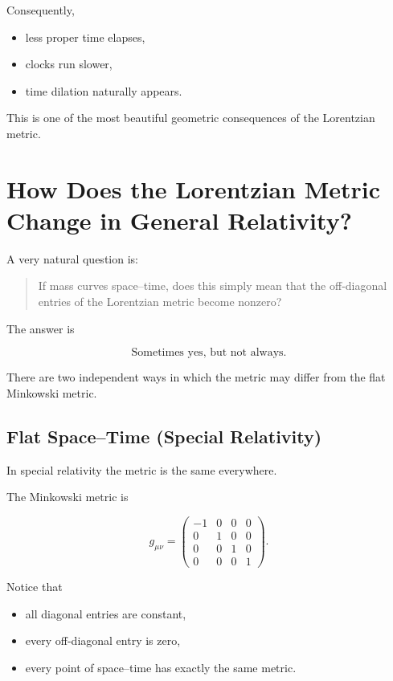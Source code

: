 \documentclass[12pt,a4paper]{article}
\theoremstyle{notespace}
\begin{document}
Consequently,

\begin{itemize}
	\item less proper time elapses,
	\item clocks run slower,
	\item time dilation naturally appears.
\end{itemize}

This is one of the most beautiful geometric consequences
of the Lorentzian metric.


\section{How Does the Lorentzian Metric Change in General Relativity?}

A very natural question is:

\begin{quote}
	If mass curves space--time, does this simply mean that the off-diagonal
	entries of the Lorentzian metric become nonzero?
\end{quote}

The answer is

\[
\boxed{\text{Sometimes yes, but not always.}}
\]

There are two independent ways in which the metric may differ from the
flat Minkowski metric.


\subsection{Flat Space--Time (Special Relativity)}

In special relativity the metric is the same everywhere.

The Minkowski metric is

\[
g_{\mu\nu}
=
\begin{pmatrix}
	-1&0&0&0\\
	0&1&0&0\\
	0&0&1&0\\
	0&0&0&1
\end{pmatrix}.
\]

Notice that

\begin{itemize}
	\item all diagonal entries are constant,
	\item every off-diagonal entry is zero,
	\item every point of space--time has exactly the same metric.
\end{itemize}
\end{document}
